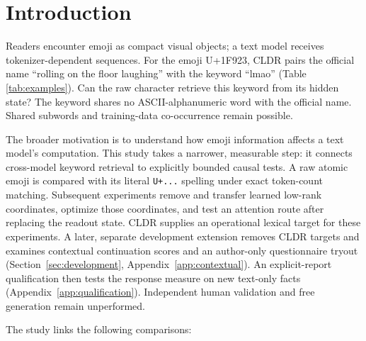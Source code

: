 \documentclass{article}
\begin{document}
\section{Introduction}

Readers encounter emoji as compact visual objects; a text model receives
tokenizer-dependent sequences. For the emoji U+1F923, CLDR pairs the official
name ``rolling on the floor laughing'' with the keyword ``lmao''
(Table \ref{tab:examples}). Can the raw character retrieve this keyword from
its hidden state? The keyword shares no ASCII-alphanumeric word with the
official name. Shared subwords and training-data co-occurrence remain possible.

The broader motivation is to understand how emoji information affects a text
model's computation. This study takes a narrower, measurable step: it connects
cross-model keyword retrieval to explicitly bounded causal tests. A raw atomic
emoji is compared with its literal \texttt{U+...} spelling under exact token-count
matching. Subsequent experiments remove and transfer learned low-rank
coordinates, optimize those coordinates, and test an attention route after
replacing the readout state. CLDR supplies an operational lexical target for
these experiments. A later, separate development extension removes CLDR
targets and examines contextual continuation scores and an author-only
questionnaire tryout (Section~\ref{sec:development}, Appendix~\ref{app:contextual}).
An explicit-report qualification then tests the response measure on new
text-only facts (Appendix~\ref{app:qualification}).
Independent human validation and free generation remain unperformed.

The study links the following comparisons:
\end{document}
